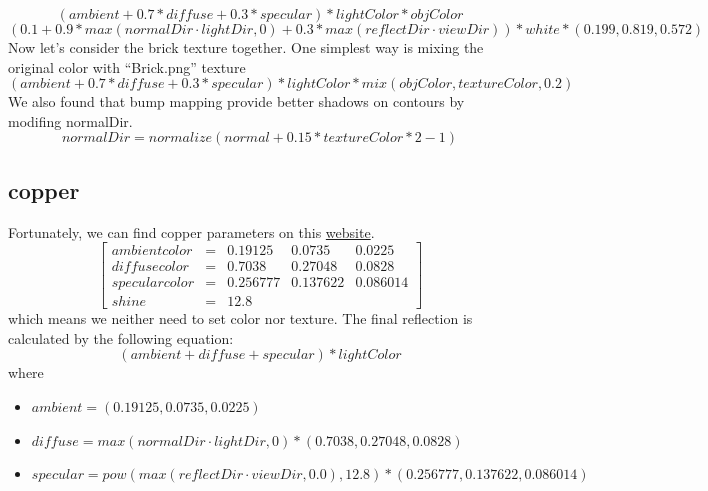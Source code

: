 \documentclass{article}
\begin{document}
\begin{equation*}
  (ambient + 0.7*diffuse + 0.3*specular) * lightColor * objColor
\end{equation*}
\begin{equation*}
  (0.1 + 0.9*max(normalDir \cdot lightDir, 0) + 0.3*max(reflectDir \cdot viewDir)) * white * (0.199, 0.819, 0.572)
\end{equation*}
Now let's consider the brick texture together. One simplest way is mixing the original color with ``Brick.png'' texture
\begin{equation*}
  (ambient + 0.7*diffuse + 0.3*specular) * lightColor * mix(objColor, textureColor, 0.2)
\end{equation*}
We also found that bump mapping provide better shadows on contours by modifing normalDir.
\begin{equation*}
  normalDir = normalize(normal + 0.15 * textureColor*2-1)
\end{equation*}

\subsection*{copper}
Fortunately, we can find copper parameters on this \href{http://www.it.hiof.no/~borres/j3d/explain/light/p-materials.html}{website}.
$$
  \begin{bmatrix}
    ambient color  & = & 0.19125 & 0.0735 & 0.0225 \\
    diffuse color  & = & 0.7038 & 0.27048 & 0.0828 \\
    specular color & = & 0.256777 & 0.137622 & 0.086014 \\
    shine          & = & 12.8
  \end{bmatrix}
$$
which means we neither need to set color nor texture. The final reflection is calculated by the following equation:
$$
  (ambient + diffuse + specular) * lightColor
$$
where
\begin{itemize}
  \item $ambient = (0.19125, 0.0735, 0.0225)$
  \item $diffuse = max(normalDir \cdot lightDir, 0) * (0.7038, 0.27048, 0.0828)$
  \item $specular = pow(max(reflectDir \cdot viewDir, 0.0), 12.8) * (0.256777, 0.137622, 0.086014)$
\end{itemize}

\section{}
\end{document}
